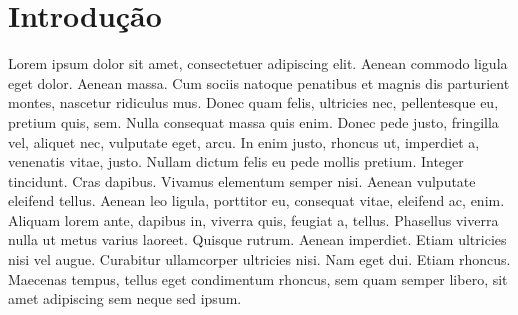 \chapter*[Introdução]{Introdução}

    Lorem ipsum dolor sit amet, consectetuer adipiscing 
    elit. Aenean commodo ligula eget dolor. Aenean massa.
    Cum sociis natoque penatibus et magnis dis parturient
    montes, nascetur ridiculus mus. Donec quam felis, 
    ultricies nec, pellentesque eu, pretium quis, sem. 
    Nulla consequat massa quis enim. Donec pede justo, 
    fringilla vel, aliquet nec, vulputate eget, arcu. In 
    enim justo, rhoncus ut, imperdiet a, venenatis vitae,
    justo. Nullam dictum felis eu pede mollis pretium. 
    Integer tincidunt. Cras dapibus. Vivamus elementum 
    semper nisi. Aenean vulputate eleifend tellus. Aenean 
    leo ligula, porttitor eu, consequat vitae, eleifend 
    ac, enim. Aliquam lorem ante, dapibus in, viverra 
    quis, feugiat a, tellus. Phasellus viverra nulla ut 
    metus varius laoreet. Quisque rutrum. Aenean imperdiet.
    Etiam ultricies nisi vel augue. Curabitur ullamcorper 
    ultricies nisi. Nam eget dui. Etiam rhoncus. Maecenas 
    tempus, tellus eget condimentum rhoncus, sem quam 
    semper libero, sit amet adipiscing sem neque sed ipsum.

\newpage